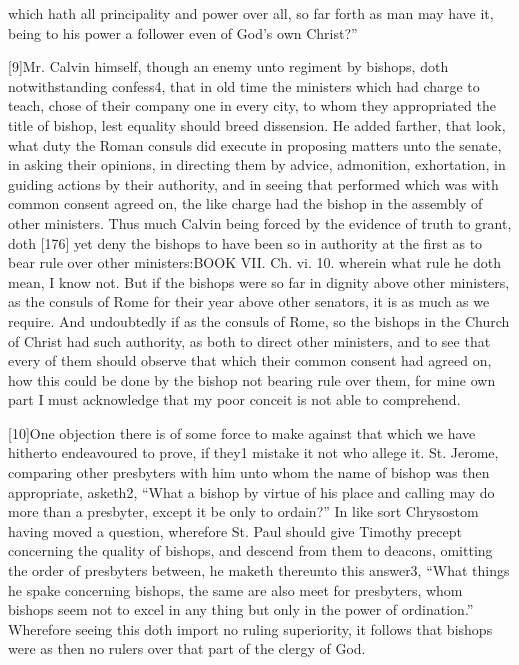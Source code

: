 which hath all principality and power over all, so far forth as man may have it, being to his power a follower even of God’s own Christ?”

[9]Mr. Calvin himself, though an enemy unto regiment by bishops, doth notwithstanding confess4, that in old time the ministers which had charge to teach, chose of their company one in every city, to whom they appropriated the title of bishop, lest equality should breed dissension. He added farther, that look, what duty the Roman consuls did execute in proposing matters unto the senate, in asking their opinions, in directing them by advice, admonition, exhortation, in guiding actions by their authority, and in seeing that performed which was with common consent agreed on, the like charge had the bishop in the assembly of other ministers. Thus much Calvin being forced by the evidence of truth to grant, doth [176] yet deny the bishops to have been so in authority at the first as to bear rule over other ministers:BOOK VII. Ch. vi. 10. wherein what rule he doth mean, I know not. But if the bishops were so far in dignity above other ministers, as the consuls of Rome for their year above other senators, it is as much as we require. And undoubtedly if as the consuls of Rome, so the bishops in the Church of Christ had such authority, as both to direct other ministers, and to see that every of them should observe that which their common consent had agreed on, how this could be done by the bishop not bearing rule over them, for mine own part I must acknowledge that my poor conceit is not able to comprehend.

[10]One objection there is of some force to make against that which we have hitherto endeavoured to prove, if they1 mistake it not who allege it. St. Jerome, comparing other presbyters with him unto whom the name of bishop was then appropriate, asketh2, “What a bishop by virtue of his place and calling may do more than a presbyter, except it be only to ordain?” In like sort Chrysostom having moved a question, wherefore St. Paul should give Timothy precept concerning the quality of bishops, and descend from them to deacons, omitting the order of presbyters between, he maketh thereunto this answer3, “What things he spake concerning bishops, the same are also meet for presbyters, whom bishops seem not to excel in any thing but only in the power of ordination.” Wherefore seeing this doth import no ruling superiority, it follows that bishops were as then no rulers over that part of the clergy of God.

